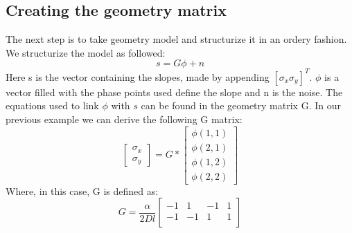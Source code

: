 \documentclass{article}
\begin{document}
\subsection{Creating the geometry matrix}
The next step is to take geometry model and structurize it in an ordery fashion. We structurize the model as followed:
$$ s = G\phi + n$$  
Here s is the vector containing the slopes, made by appending $[\sigma_x \sigma_y]^T$. $\phi$ is a vector filled with the phase points used define the slope and n is the noise. The equations used to link $\phi$ with $s$ can be found in the geometry matrix G. In our previous example we can derive the following G matrix:
$$ 
\begin{bmatrix}
\sigma_x \\
\sigma_y
\end{bmatrix} 
=
G
*
\begin{bmatrix}
\phi(1,1) \\
\phi(2,1) \\
\phi(1,2) \\
\phi(2,2) 
\end{bmatrix}
$$
Where, in this case, G is defined as:
$$
G
=
\frac{\alpha}{2Dl}
\begin{bmatrix}
-1 & 1 & -1 & 1 \\
-1 & -1 & 1 & 1 \\
\end{bmatrix}
$$
\end{document}
